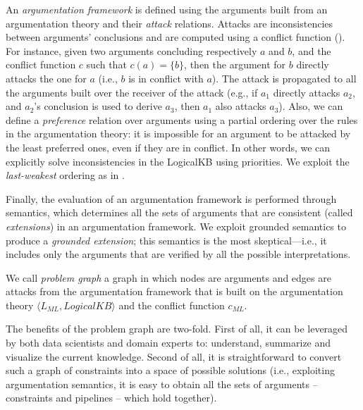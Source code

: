 An \emph{argumentation framework} is defined using the arguments built from an argumentation theory and their \emph{attack} relations.
Attacks are inconsistencies between arguments' conclusions and are computed using a conflict function ().
For instance, given two arguments concluding respectively $a$ and $b$, and the conflict function $c$ such that $c(a) = \{b\}$, then the argument for $b$ directly attacks the one for $a$ (i.e., $b$ is in conflict with $a$).
The attack is propagated to all the arguments built over the receiver of the attack (e.g., if $a_1$ directly attacks $a_2$, and $a_2$'s conclusion is used to derive $a_3$, then $a_1$ also attacks $a_3$).
Also, we can define a \emph{preference} relation over arguments using a partial ordering over the rules in the argumentation theory:
it is impossible for an argument to be attacked by the least preferred ones, even if they are in conflict.
In other words, we can explicitly solve inconsistencies in the LogicalKB using priorities.
We exploit the \emph{last-weakest} ordering as in \cite{Modgil2014aspic+}.

Finally, the evaluation of an argumentation framework is performed through semantics, which determines all the sets of arguments that are consistent (called \emph{extensions}) in an argumentation framework.
We exploit grounded semantics \cite{Dung1995abstractArg} to produce a \emph{grounded extension}; this semantics is the most skeptical---i.e., it includes only the arguments that are verified by all the possible interpretations. %

\begin{definition}
We call \emph{problem graph} a graph in which nodes are arguments and edges are attacks from the argumentation framework that is built on the argumentation theory $\langle L_{ML}, LogicalKB \rangle$ and the conflict function $c_{ML}$.
\end{definition}

The benefits of the problem graph are two-fold.
First of all, it can be leveraged by both data scientists and domain experts to: understand, summarize and visualize the current knowledge.
Second of all, it is straightforward to convert such a graph of constraints into a space of possible solutions (i.e., exploiting argumentation semantics, it is easy to obtain all the sets of arguments -- constraints and pipelines -- which hold together).

